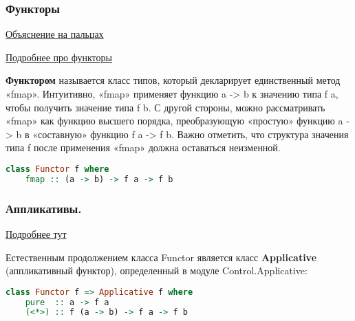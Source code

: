 \documentclass{article}
\begin{document}
\subsubsection{Функторы}

\href{https://habr.com/ru/post/183150/}{Объяснение на пальцах}

\href{http://cmc-msu-ai.github.io/haskell-course/lecture/2013/09/07/functors.html}{Подробнее про функторы}

\textbf{Функтором} называется класс типов, который декларирует единственный метод «fmap». Интуитивно, «fmap» применяет функцию a -> b к значению типа f a, чтобы получить значение типа f b. С другой стороны, можно рассматривать «fmap» как функцию высшего порядка, преобразующую «простую» функцию a -> b в «составную» функцию f a -> f b. Важно отметить, что структура значения типа f после применения «fmap» должна оставаться неизменной.

\begin{lstlisting}[language=Haskell]
class Functor f where
	fmap :: (a -> b) -> f a -> f b
\end{lstlisting}

\subsubsection{Аппликативы.}
\href{http://cmc-msu-ai.github.io/haskell-course/lecture/2013/09/08/applicative-and-monad.html}{Подробнее тут}

Естественным продолжением класса Functor является класс \textbf{Applicative} (аппликативный функтор), определенный в модуле Control.Applicative:

\begin{lstlisting}[language=Haskell]
class Functor f => Applicative f where
	pure  :: a -> f a
	(<*>) :: f (a -> b) -> f a -> f b
\end{lstlisting}
\end{document}
